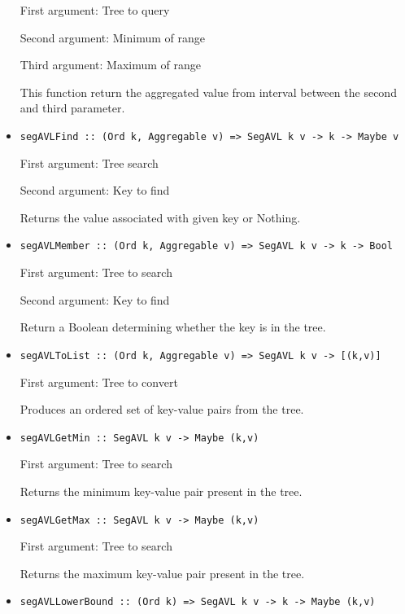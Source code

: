 \documentclass[a4paper,10pt,openany]{article}
\begin{document}
\begin{itemize}
First argument: Tree to query

Second argument: Minimum of range

Third argument: Maximum of range

This function return the aggregated value from interval between the second and third parameter.
\item \begin{lstlisting}
segAVLFind :: (Ord k, Aggregable v) => SegAVL k v -> k -> Maybe v
\end{lstlisting}

First argument: Tree search

Second argument: Key to find

Returns the value associated with given key or Nothing.
\item \begin{lstlisting}
segAVLMember :: (Ord k, Aggregable v) => SegAVL k v -> k -> Bool
\end{lstlisting}

First argument: Tree to search

Second argument: Key to find

Return a Boolean determining whether the key is in the tree.
\item \begin{lstlisting}
segAVLToList :: (Ord k, Aggregable v) => SegAVL k v -> [(k,v)]
\end{lstlisting}

First argument: Tree to convert

Produces an ordered set of key-value pairs from the tree.
\item \begin{lstlisting}
segAVLGetMin :: SegAVL k v -> Maybe (k,v)
\end{lstlisting}

First argument: Tree to search

Returns the minimum key-value pair present in the tree.
\item \begin{lstlisting}
segAVLGetMax :: SegAVL k v -> Maybe (k,v)
\end{lstlisting}

First argument: Tree to search

Returns the maximum key-value pair present in the tree.
\item \begin{lstlisting}
segAVLLowerBound :: (Ord k) => SegAVL k v -> k -> Maybe (k,v)
\end{lstlisting}


\end{itemize}
\end{document}
